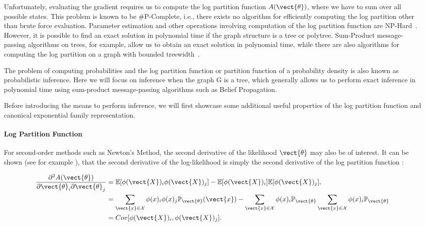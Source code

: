     Unfortunately, evaluating the gradient requires us to compute the log partition function $A(\vect{\theta})$, where we have to sum over all possible states.
    This problem is known to be \#P-Complete, i.e., there exists no algorithm for efficiently computing the log partition other than brute force evaluation.
    Parameter estimation and other operations involving computation of the log partition function are NP-Hard~\cite{cooper1990computational}.
    However, it is possible to find an exact solution in polynomial time if the graph structure is a tree or polytree.
    Sum-Product message-passing algorithms on trees, for example, allow us to obtain an exact solution in polynomial time, while there are also algorithms for computing the log partition on a graph with bounded treewidth~\cite{berg2014learning}.

    The problem of computing probabilities and the log partition function or partition function of a probability density is also known as probabilistic inference.
    Here we will focus on inference when the graph G is a tree, which generally allows us to perform exact inference in polynomial time using sum-product message-passing algorithms such as Belief Propagation.

    Before introducing the means to perform inference, we will first showcase some additional useful properties of the log partition function and canonical exponential family representation.
    
    \paragraph*{Log Partition Function}
    For second-order methods such as Newton's Method, the second derivative of the likelihood \wrt $\vect{\theta}$ may also be of interest.
    It can be shown (see for example \cite{piatkowski2018exponential}), that the second derivative of the log-likelihood is simply the second derivative of the log partition function :

    \begin{equation}
        \label{eq:sparsefish}
        \begin{split}
        \frac{\partial^2 A(\vect{\theta})}{\partial \vect{\theta}_i \partial \vect{\theta}_j} &= \mathbb{E}[\phi(\vect{X})_i \phi(\vect{X})_j] - \mathbb{E}[\phi(\vect{X})_i] \mathbb{E}[\phi(\vect{X})_j], \\
        &= \sum_{\vect{x} \in \mathcal{X}} \phi(x)_i \phi(x)_j \mathbb{P}_{\vect{\theta}}(\vect{x}) - \sum_{\vect{x} \in \mathcal{X}} \phi(x)_i \mathbb{P}_{\vect{\theta}} \sum_{\vect{x} \in \mathcal{X}} \phi(x)_i  \mathbb{P}_{\vect{\theta}} \\
        &= Cov[\phi(\vect{X})_i, \phi(\vect{X})_j].
        \end{split}
    \end{equation}

